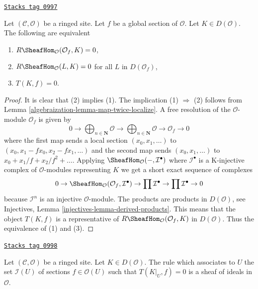 \begin{lemma}
\label{algebraization-lemma-hom-from-Af}
\href{https://stacks.math.columbia.edu/tag/0997}{\texttt{Stacks tag 0997}}

Let $(\mathcal{C}, \mathcal{O})$ be a ringed site. Let $f$ be a global
section of $\mathcal{O}$. Let $K \in D(\mathcal{O})$.
The following are equivalent
\begin{enumerate}
\item $R\SheafHom_\mathcal{O}(\mathcal{O}_f, K) = 0$,
\item $R\SheafHom_\mathcal{O}(L, K) = 0$ for all $L$ in $D(\mathcal{O}_f)$,
\item $T(K, f) = 0$.
\end{enumerate}
\end{lemma}

\begin{proof}

It is clear that (2) implies (1). The implication (1) $\Rightarrow$ (2)
follows from Lemma \ref{algebraization-lemma-map-twice-localize}.
A free resolution of the $\mathcal{O}$-module $\mathcal{O}_f$ is given by
$$
0 \to \bigoplus\nolimits_{n \in \mathbf{N}} \mathcal{O} \to
\bigoplus\nolimits_{n \in \mathbf{N}} \mathcal{O}
\to \mathcal{O}_f \to 0
$$
where the first map sends a local section $(x_0, x_1, \ldots)$ to
$(x_0, x_1 - fx_0, x_2 - fx_1, \ldots)$ and the second map sends
$(x_0, x_1, \ldots)$ to $x_0 + x_1/f + x_2/f^2 + \ldots$.
Applying $\SheafHom_\mathcal{O}(-, \mathcal{I}^\bullet)$
where $\mathcal{I}^\bullet$ is a K-injective complex of $\mathcal{O}$-modules
representing $K$ we get a short exact sequence of complexes
$$
0 \to \SheafHom_\mathcal{O}(\mathcal{O}_f, \mathcal{I}^\bullet) \to
\prod \mathcal{I}^\bullet \to \prod \mathcal{I}^\bullet \to 0
$$
because $\mathcal{I}^n$ is an injective $\mathcal{O}$-module.
The products are products in $D(\mathcal{O})$, see
Injectives, Lemma \ref{injectives-lemma-derived-products}.
This means that the object $T(K, f)$ is a representative of
$R\SheafHom_\mathcal{O}(\mathcal{O}_f, K)$ in $D(\mathcal{O})$.
Thus the equivalence of (1) and (3).
\end{proof}

\begin{lemma}
\label{algebraization-lemma-ideal-of-elements-complete-wrt}
\href{https://stacks.math.columbia.edu/tag/0998}{\texttt{Stacks tag 0998}}

Let $(\mathcal{C}, \mathcal{O})$ be a ringed site. Let $K \in D(\mathcal{O})$.
The rule which associates to $U$ the set $\mathcal{I}(U)$
of sections $f \in \mathcal{O}(U)$ such that $T(K|_U, f) = 0$
is a sheaf of ideals in $\mathcal{O}$.
\end{lemma}

